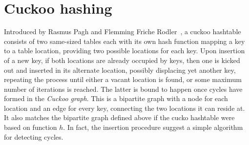 \documentclass[11pt, oneside]{article}
\begin{document}
\section{Cuckoo hashing}
Introduced by Rasmus Pagh and Flemming Friche
Rodler~\cite{Pagh04cuckoohashing}, a cuckoo hashtable consists of two
same-sized tables each with its own hash function mapping a key to a table
location, providing two possible locations for each key.
Upon insertion of a new key, if both locations are already occupied by keys,
then one is kicked out and inserted in its alternate location, possibly
displacing yet another key, repeating the process until either a vacant
location is found, or some maximum number of iterations is reached.
The latter is bound to happen once cycles have formed in the {\em Cuckoo graph}.
This is a bipartite graph with a node for each location and an
edge for every key, connecting the two locations it can reside at.
It also matches the bipartite graph defined above if the cucko hashtable
were based on function $h$.
In fact, the insertion procedure suggest a simple algorithm for detecting cycles.
\end{document}

